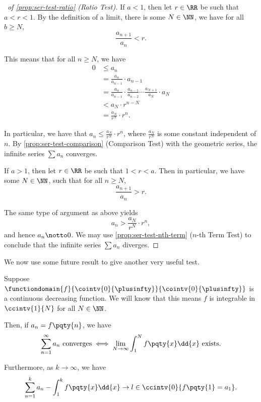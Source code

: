 \begin{proof}[\proofname\ of \autoref{prop:ser-test-ratio} (Ratio Test)]
    If \(a < 1\), then let \(r \in \RR\) be such that \(a < r < 1\). By the definition of a limit, there is some \(N \in \NN\), we have for all \(b \geq N\),
    \[
        \frac{a_{n + 1}}{a_n} < r.
    \]
    
    This means that for all \(n \geq N\), we have
    \begin{align*}
        0 &\leq a_n \\
          &= \frac{a_n}{a_{n - 1}} \cdot a_{n - 1} \\
          &= \frac{a_n}{a_{n - 1}} \cdot \frac{a_{n - 1}}{a_{n - 2}} \cdots \frac{a_{N + 1}}{a_N} \cdot a_{N} \\
          &< a_N \cdot r^{n - N} \\
          &= \frac{a_N}{r^N} \cdot r^n.
    \end{align*}

    In particular, we have that \(a_n \leq \frac{a_N}{r^N} \cdot r^n\), where \(\frac{a_N}{r^N}\) is some constant independent of \(n\). By \autoref{prop:ser-test-comparison} (Comparison Test) with the geometric series, the infinite series \(\sum a_n\) converges.

    If \(a > 1\), then let \(r \in \RR\) be such that \(1 < r < a\). Then in particular, we have some \(N \in \NN\), such that for all \(n \geq N\),
    \[
        \frac{a_{n + 1}}{a_n} > r.
    \]
    
    The same type of argument as above yields
    \[
        a_n > \frac{a_N}{r^N} \cdot r^n,
    \]
    and hence \(a_n \notto 0\). We may use \autoref{prop:ser-test-nth-term} (\(n\)-th Term Test) to conclude that the infinite series \(\sum a_n\) diverges.
\end{proof}

We now use some future result to give another very useful test.

\begin{proposition}
    \label{prop:ser-test-integral}%
    Suppose \(\functiondomain{f}{\cointv{0}{\plusinfty}}{\cointv{0}{\plusinfty}}\) is a continuous decreasing function. We will know that this means \(f\) is integrable in \(\ccintv{1}{N}\) for all \(N \in \NN\).

    Then, if \(a_n = f\pqty{n}\), we have
    \[
        \sum_{n = 1}^{\infty} a_n \text{ converges} \iff \lim_{N \to \infty} \int_{1}^{N} f\pqty{x} \dd{x} \text{ exists}.
    \]

    Furthermore, as \(k \to \infty\), we have
    \[
        \sum_{n = 1}^{k} a_n - \int_{1}^{k} f\pqty{x} \dd{x} \to l \in \ccintv{0}{f\pqty{1} = a_1}.
    \]
\end{proposition}

